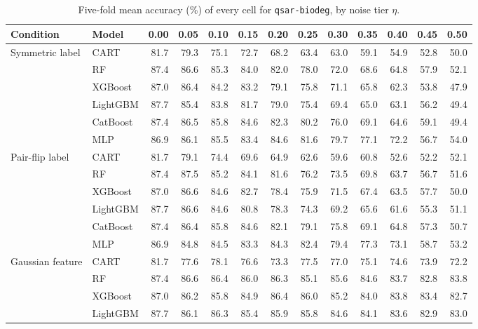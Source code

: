 \begin{table}[p]
\centering
\tiny
\setlength{\tabcolsep}{2.6pt}
\caption{Five-fold mean accuracy (\%) of every cell for \texttt{qsar-biodeg}, by noise tier $\eta$.}
\label{tab:grid_qsar_biodeg}
\begin{tabular}{@{}llrrrrrrrrrrr@{}}
\toprule
Condition & Model & 0.00 & 0.05 & 0.10 & 0.15 & 0.20 & 0.25 & 0.30 & 0.35 & 0.40 & 0.45 & 0.50 \\
\midrule
Symmetric label & CART & 81.7 & 79.3 & 75.1 & 72.7 & 68.2 & 63.4 & 63.0 & 59.1 & 54.9 & 52.8 & 50.0 \\
 & RF & 87.4 & 86.6 & 85.3 & 84.0 & 82.0 & 78.0 & 72.0 & 68.6 & 64.8 & 57.9 & 52.1 \\
 & XGBoost & 87.0 & 86.4 & 84.2 & 83.2 & 79.1 & 75.8 & 71.1 & 65.8 & 62.3 & 53.8 & 47.9 \\
 & LightGBM & 87.7 & 85.4 & 83.8 & 81.7 & 79.0 & 75.4 & 69.4 & 65.0 & 63.1 & 56.2 & 49.4 \\
 & CatBoost & 87.4 & 86.5 & 85.8 & 84.6 & 82.3 & 80.2 & 76.0 & 69.1 & 64.6 & 59.1 & 49.4 \\
 & MLP & 86.9 & 86.1 & 85.5 & 83.4 & 84.6 & 81.6 & 79.7 & 77.1 & 72.2 & 56.7 & 54.0 \\
\midrule
Pair-flip label & CART & 81.7 & 79.1 & 74.4 & 69.6 & 64.9 & 62.6 & 59.6 & 60.8 & 52.6 & 52.2 & 52.1 \\
 & RF & 87.4 & 87.5 & 85.2 & 84.1 & 81.6 & 76.2 & 73.5 & 69.8 & 63.7 & 56.7 & 51.6 \\
 & XGBoost & 87.0 & 86.6 & 84.6 & 82.7 & 78.4 & 75.9 & 71.5 & 67.4 & 63.5 & 57.7 & 50.0 \\
 & LightGBM & 87.7 & 86.6 & 84.6 & 80.8 & 78.3 & 74.3 & 69.2 & 65.6 & 61.6 & 55.3 & 51.1 \\
 & CatBoost & 87.4 & 86.4 & 85.8 & 84.6 & 82.1 & 79.1 & 75.8 & 69.1 & 64.8 & 57.3 & 50.7 \\
 & MLP & 86.9 & 84.8 & 84.5 & 83.3 & 84.3 & 82.4 & 79.4 & 77.3 & 73.1 & 58.7 & 53.2 \\
\midrule
Gaussian feature & CART & 81.7 & 77.6 & 78.1 & 76.6 & 73.3 & 77.5 & 77.0 & 75.1 & 74.6 & 73.9 & 72.2 \\
 & RF & 87.4 & 86.6 & 86.4 & 86.0 & 86.3 & 85.1 & 85.6 & 84.6 & 83.7 & 82.8 & 83.8 \\
 & XGBoost & 87.0 & 86.2 & 85.8 & 84.9 & 86.4 & 86.0 & 85.2 & 84.0 & 83.8 & 83.4 & 82.7 \\
 & LightGBM & 87.7 & 86.1 & 86.3 & 85.4 & 85.9 & 85.8 & 84.6 & 84.1 & 83.6 & 82.9 & 83.0 \\

\end{tabular}
\end{table}

